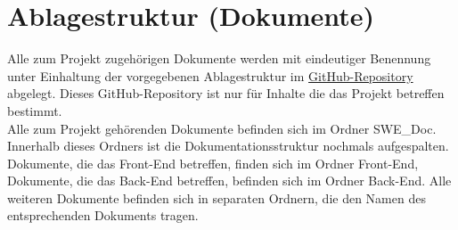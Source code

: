 
\chapter{Ablagestruktur (Dokumente)}
Alle zum Projekt zugehörigen Dokumente werden mit eindeutiger Benennung unter Einhaltung der vorgegebenen Ablagestruktur im \href{https://github.com/LucRome/SWE_Semester4}{GitHub-Repository} abgelegt. Dieses \gls{GitHub}-\gls{Repository} ist nur für Inhalte die das Projekt betreffen bestimmt.\\

Alle zum Projekt gehörenden Dokumente befinden sich im Ordner \glqq SWE\_Doc\grqq. \\
Innerhalb dieses Ordners ist die Dokumentationsstruktur nochmals aufgespalten. Dokumente, die das \gls{Front-End} betreffen, finden sich im Ordner \glqq \gls{Front-End}\grqq , Dokumente, die das \gls{Back-End} betreffen, befinden sich im Ordner \glqq \gls{Back-End}\grqq. Alle weiteren Dokumente befinden sich in separaten Ordnern, die den Namen des entsprechenden Dokuments tragen.\\
